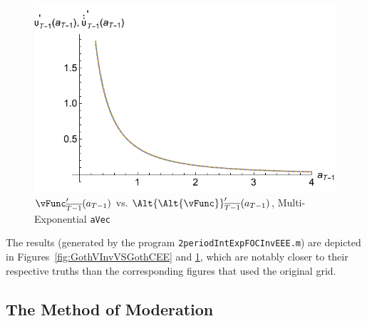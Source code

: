 \documentclass[titlepage, headings=optiontotocandhead]{\econtex}
\begin{document}
\hypertarget{GothVVSGothCInvEEE}{}
\begin{figure}
  \includegraphics{./Figures/GothVVSGothCInvEEE}
  \caption{$\vFunc^{\prime}_{\overline{T-1}}({a}_{T-1})$ vs.
    $\Alt{\Alt{\vFunc}}_{\overline{T-1}}^{\prime}({a}_{T-1})$, Multi-Exponential \texttt{aVec}}
  \label{fig:GothVVSGothCInvEE}
\end{figure}

The results (generated by the program \texttt{2periodIntExpFOCInvEEE.m})
are depicted in Figures~\ref{fig:GothVInvVSGothCEE} and
\ref{fig:GothVVSGothCInvEE}, which are notably closer to their
respective truths than the corresponding figures that used the original
grid.

\hypertarget{The-Method-of-Moderation}{}
\subsection{The Method of Moderation}
\end{document}
